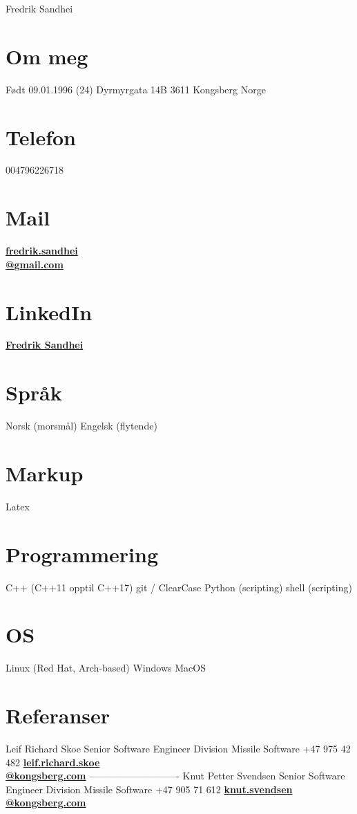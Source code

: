 \documentclass[]{friggeri-cv}
\begin{document}
       {Fredrik Sandhei}

\begin{aside}
  \section{Om meg}
    Født 09.01.1996 (24)
    Dyrmyrgata 14B 
    3611 Kongsberg
    Norge
  \section{Telefon}
    004796226718
  \section{Mail}
    \href{mailto:fredrik.sandhei@gmail.com}{\textbf{fredrik.sandhei\\@gmail.com}}   
  \section{LinkedIn}
  	\href{https://www.linkedin.com/in/fredrik-sandhei-7738b617a/}{\textbf{Fredrik Sandhei}}
  \section{Språk}
    Norsk (morsmål)
    Engelsk (flytende)
  \section{Markup}
  	Latex
  \section{Programmering}
    C++ (C++11 opptil C++17)
    git / ClearCase 
    Python (scripting)
    shell (scripting)
  \section{OS}
  	Linux (Red Hat, Arch-based)
  	Windows
  	MacOS
  \section{Referanser}
    Leif Richard Skoe
    Senior Software Engineer
    Division Missile Software
    +47 975 42 482
   \href{mailto:leif.richard.skoe@kongsberg.com}{\textbf{leif.richard.skoe\\@kongsberg.com}}	
    ----------------------------
    Knut Petter Svendsen
    Senior Software Engineer
    Division Missile Software
    +47 905 71 612
    \href{mailto:knut.svendsen@kongsberg.com}{\textbf{knut.svendsen\\@kongsberg.com}}
\end{aside}
\end{document}
